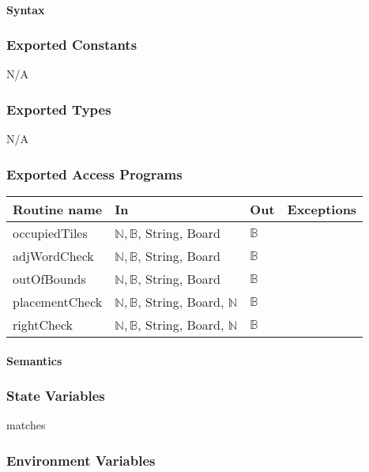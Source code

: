 \documentclass[12pt]{article}
\begin{document}
\paragraph*{Syntax}

\subsubsection*{Exported Constants}
N/A
\subsubsection*{Exported Types}

N/A

\subsubsection* {Exported Access Programs}

\begin{tabular}{| l | l | l | l |}
\hline
\textbf{Routine name} & \textbf{In} & \textbf{Out} & \textbf{Exceptions}\\
\hline
occupiedTiles & $\mathbb{N}, \mathbb{B}$, String, Board & $\mathbb{B}$ & \\
\hline
adjWordCheck & $\mathbb{N}, \mathbb{B}$, String, Board & $\mathbb{B}$ & \\
\hline
outOfBounds & $\mathbb{N}, \mathbb{B}$, String, Board & $\mathbb{B}$ & \\
\hline
placementCheck & $\mathbb{N}, \mathbb{B}$, String, Board, $\mathbb{N}$ & $\mathbb{B}$ & \\
\hline
rightCheck & $\mathbb{N}, \mathbb{B}$, String, Board, $\mathbb{N}$ & $\mathbb{B}$ & \\
\hline
\end{tabular}

\paragraph* {Semantics}

\subsubsection*{State Variables}

matches

\subsubsection*{Environment Variables}
\end{document}

